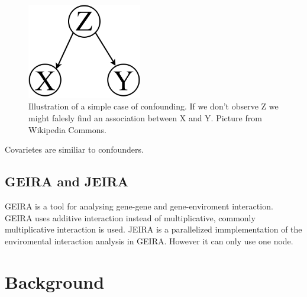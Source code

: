 \documentclass[10pt,a4paper]{article}
\begin{document}
\begin{figure}[h]
    \centering
    \includegraphics[width=5cm]{Simple_Confounding_Case.png}
    \caption{Illustration of a simple case of confounding. If we don't observe Z we might falesly find an association between X and Y. Picture from Wikipedia Commons.}
    \label{fig:awesome_image}
\end{figure}

 \cite{rothman1998modern}

Covarietes are similiar to confounders.

\subsection{GEIRA and JEIRA}
GEIRA is a tool for analysing gene-gene and gene-enviroment interaction. GEIRA uses additive interaction instead of multiplicative, commonly multiplicative interaction is used\cite{geira}. JEIRA is a parallelized immplementation of the enviromental interaction analysis in GEIRA. However it can only use one node.

\clearpage
\section{Background}
\end{document}
